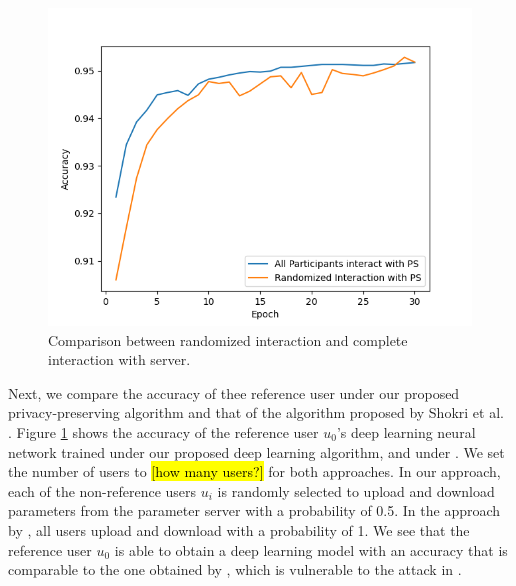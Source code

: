 \documentclass[conference]{IEEEtran}
\begin{document}
\begin{figure}[!h]
\centering
\includegraphics[width=\columnwidth, keepaspectratio]{RandomVsAll}
\caption{Comparison between randomized interaction and complete interaction with server. }
\label{fig:RandVsAll}
\end{figure}
Next, we compare the accuracy of thee reference user under our proposed privacy-preserving algorithm and that of the algorithm proposed
by Shokri et al. \cite{shokri2015privacy}. Figure \ref{fig:RandVsAll} shows the accuracy of the reference user $u_0$'s deep learning
neural network trained under our proposed deep learning algorithm, and under \cite{shokri2015privacy}. We set the number of
users to \hl{[how many
users?]} for both approaches. In our approach, each of the non-reference users $u_i$ is randomly
selected to upload and download parameters from the parameter server with a probability of 0.5. 
In the approach by \cite{shokri2015privacy}, all users upload and download with a probability of 1. 
We see that the reference user $u_0$ is able to obtain a deep learning model with an accuracy that is comparable to the one
obtained by \cite{shokri2015privacy}, which is vulnerable to the attack in \cite{hitaj2017deep}. 
\end{document}
